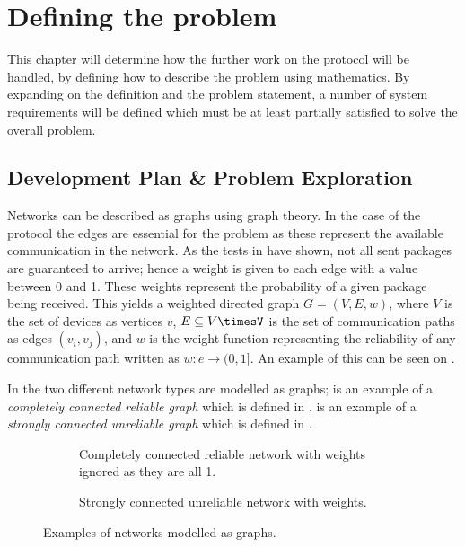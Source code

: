 \chapter{Defining the problem}
This chapter will determine how the further work on the protocol will be handled, by defining how to describe the problem using mathematics. 
By expanding on the definition and the problem statement, a number of system requirements will be defined which must be at least partially satisfied to solve the overall problem.

\section{Development Plan \& Problem Exploration}\label{chp:Problems}
Networks can be described as graphs using graph theory. 
In the case of the protocol the edges are essential for the problem as these represent the available communication in the network.
As the tests in  have shown, not all sent packages are guaranteed to arrive; hence a weight is given to each edge with a value between 0 and 1.
These weights represent the probability of a given package being received.
This yields a weighted directed graph $G = (V, E, w)$, where $V$ is the set of devices as vertices $v$, $E \subseteq V\timesV$ is the set of communication paths as edges $(v_i, v_j)$, and $w$ is the weight function representing the reliability of any communication path written as $w : e \rightarrow (0,1]$. 
An example of this can be seen on .

In  the two different network types are modelled as graphs; 
 is an example of a \emph{completely connected reliable graph} which is defined in .
 is an example of a \emph{strongly connected unreliable graph} which is defined in .

\begin{figure}[H]
    \footnotesize
    \begin{subfigure}{0.47\linewidth}
        \centering
        
        \caption{Completely connected reliable network with weights ignored as they are all 1.}
        \label{fig:ccrcnetworkgraph}
    \end{subfigure}\hfill
    \begin{subfigure}{0.47\linewidth}
        \centering
        
        \caption{Strongly connected unreliable network with weights.}
        \label{fig:network}
    \end{subfigure}
    \caption{Examples of networks modelled as graphs.}
    \label{fig:examplenetworkgraphs}
    \vspace{-20pt}
\end{figure}

